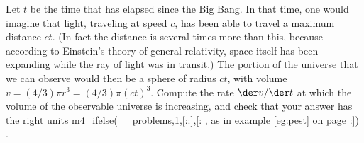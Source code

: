 Let $t$ be the time that has elapsed since the Big Bang. In that time, one would imagine that light, traveling at speed
$c$, has been able to travel a maximum distance $ct$. (In fact the distance is several times more than this, because
according to Einstein's theory of general relativity, space itself has been expanding while the ray of light was
in transit.) The portion of the universe that we can observe
would then be a sphere of radius $ct$, with volume $v=(4/3)\pi r^3=(4/3)\pi(ct)^3$. Compute the rate
$\der v/\der t$ at which the volume of the observable universe is increasing, and check that your answer has the right
units%
m4_ifelse(__problems,1,[::],[:%
  , as in example \ref{eg:pest} on page \pageref{eg:pest}%
:])%
.\answercheck
